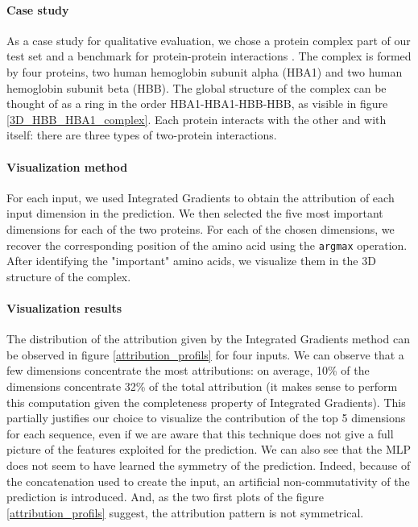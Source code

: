 \documentclass[11pt,a4paper]{article}
\begin{document}
\paragraph{Case study}
As a case study for qualitative evaluation, we chose a protein complex part of our test set and a benchmark for protein-protein interactions \cite{hwang2010protein}. The complex is formed by four proteins, two human hemoglobin subunit alpha (HBA1) and two human hemoglobin subunit beta (HBB). The global structure of the complex can be thought of as a ring in the order HBA1-HBA1-HBB-HBB, as visible in figure \ref{3D_HBB_HBA1_complex}. Each protein interacts with the other and with itself: there are three types of two-protein interactions.

\paragraph{Visualization method}
For each input, we used Integrated Gradients \cite{sundararajan2017axiomatic} to obtain the attribution of each input dimension in the prediction. We then selected the five most important dimensions for each of the two proteins. For each of the chosen dimensions, we recover the corresponding position of the amino acid using the \texttt{argmax} operation. After identifying the "important" amino acids, we visualize them in the 3D structure of the complex.

\paragraph{Visualization results}

The distribution of the attribution given by the Integrated Gradients method can be observed in figure \ref{attribution_profils} for four inputs. We can observe that a few dimensions concentrate the most attributions: on average, 10\% of the dimensions concentrate 32\% of the total attribution (it makes sense to perform this computation given the completeness property of Integrated Gradients).  This partially justifies our choice to visualize the contribution of the top 5 dimensions for each sequence, even if we are aware that this technique does not give a full picture of the features exploited for the prediction. We can also see that the MLP does not seem to have learned the symmetry of the prediction. Indeed, because of the concatenation used to create the input, an artificial non-commutativity of the prediction is introduced. And, as the two first plots of the figure \ref{attribution_profils}  suggest, the attribution pattern is not symmetrical. 
\end{document}
